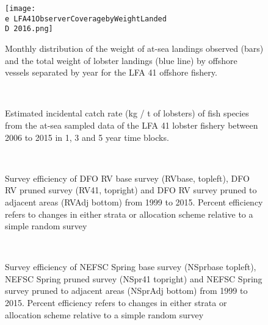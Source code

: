 \documentclass[11pt]{article}
\newcommand{\D}{.}
\newcommand{\e}{/backup/bio_data/bio.lobster/figures/} %
\begin{document}
\begin{figure}
        \centering
        \texttt{[image: \\e LFA41ObserverCoveragebyWeightLanded\\D 2016.png]}
        \caption{Monthly distribution of the weight of at-sea landings observed  (bars) and the total weight of lobster landings (blue line) by offshore vessels separated by year for the LFA 41 offshore fishery. }
        \end{figure}
        \clearpage


\begin{landscape}
        \begin{figure}
        \centering
        \\
        \caption{Estimated incidental catch rate (kg / t of lobsters) of fish species from the at-sea sampled data of the LFA 41 lobster fishery between 2006 to 2015 in 1, 3 and 5 year time blocks.}
        \end{figure}
        \clearpage

\end{landscape}





        \begin{figure}
        \centering
        \\
        \caption{Survey efficiency of DFO RV base survey (RVbase, topleft), DFO RV pruned survey (RV41, topright) and DFO RV survey pruned to adjacent areas (RVAdj bottom) from 1999 to 2015. Percent efficiency refers to changes in either strata or allocation scheme relative to a simple random survey }
        \end{figure}
        \clearpage



        \begin{figure}
        \centering
        \\
        \caption{Survey efficiency of NEFSC Spring base survey (NSprbase topleft), NEFSC Spring pruned survey (NSpr41 topright) and NEFSC Spring survey pruned to adjacent areas (NSprAdj bottom) from 1999 to 2015. Percent efficiency refers to changes in either strata or allocation scheme relative to a simple random survey }
        \end{figure}
        \clearpage
\end{document}
